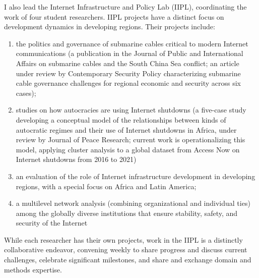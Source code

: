 \documentclass[11pt]{letter}
\begin{document}
\begin{letter}
I also lead the Internet Infrastructure and Policy Lab (IIPL), coordinating the work of four student researchers.
%
IIPL projects have a distinct focus on development dynamics in developing regions.
%
Their projects include: 
%
\begin{enumerate}
  \item the politics and governance of submarine cables critical to modern Internet communications (a publication in the Journal of Public and International Affairs on submarine cables and the South China Sea conflict; an article under review by Contemporary Security Policy characterizing submarine cable governance challenges for regional economic and security across six cases);
  \item studies on how autocracies are using Internet shutdowns (a five-case study developing a conceptual model of the relationships between kinds of autocratic regimes and their use of Internet shutdowns in Africa, under review by Journal of Peace Research; current work is operationalizing this model, applying cluster analysis to a global dataset from Access Now on Internet shutdowns from 2016 to 2021)
  \item an evaluation of the role of Internet infrastructure development in developing regions, with a special focus on Africa and Latin America;
  \item a multilevel network analysis (combining organizational and individual ties) among the globally diverse institutions that ensure stability, safety, and security of the Internet
\end{enumerate}
%
While each researcher has their own projects, work in the IIPL is a distinctly collaborative endeavor, convening weekly to share progress and discuss current challenges, celebrate significant milestones, and share and exchange domain and methods expertise.
%


%
%



\end{letter}
\end{document}
